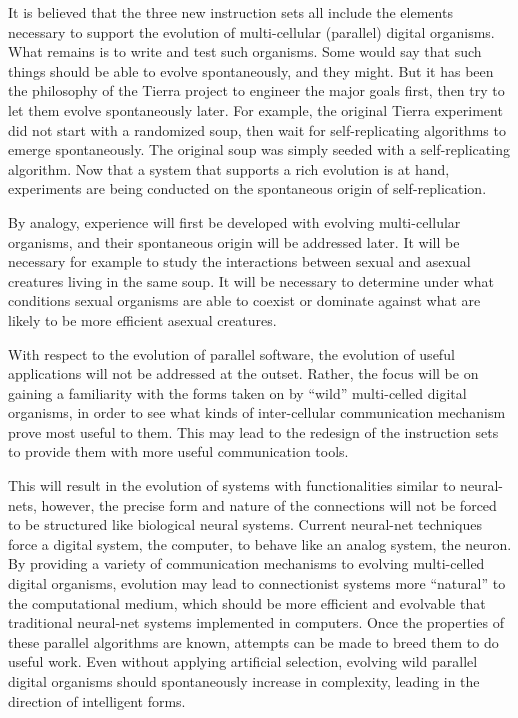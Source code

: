 It is believed that the three new instruction sets all include the elements
necessary to support the evolution of multi-cellular (parallel) digital
organisms.  What remains is to write and test such organisms.  Some would
say that such things should be able to evolve spontaneously, and they might.
But it has been the philosophy of the Tierra project to engineer the major
goals first, then try to let them evolve spontaneously later.  For example,
the original Tierra experiment did not start with a randomized soup, then
wait for self-replicating algorithms to emerge spontaneously.  The original
soup was simply seeded with a self-replicating algorithm.  Now that a system
that supports a rich evolution is at hand, experiments are being conducted on
the spontaneous origin of self-replication.

By analogy, experience will first be developed with evolving multi-cellular
organisms, and their spontaneous origin will be addressed later.  It will be
necessary for example to study the interactions between sexual and asexual
creatures living in the same soup.  It will be necessary to determine
under what conditions sexual organisms are able to coexist or dominate
against what are likely to be more efficient asexual creatures.

With respect to the evolution of parallel software, the evolution of useful
applications will not be addressed at the outset.  Rather, the focus will be
on gaining a familiarity with the forms taken on by ``wild'' multi-celled
digital organisms, in order to see what kinds of inter-cellular communication
mechanism prove most useful to them.  This may lead to the redesign of the
instruction sets to provide them with more useful communication tools.  

This will result in the evolution of systems with functionalities similar
to neural-nets, however, the precise form and nature of the connections will
not be forced to be structured like biological neural systems.  Current
neural-net techniques force a digital system, the computer, to behave like
an analog system, the neuron.  By providing a variety of communication
mechanisms to evolving multi-celled digital organisms, evolution may lead
to connectionist systems more ``natural'' to the computational medium,
which should be more efficient and evolvable that traditional neural-net
systems implemented in computers.  Once the properties of these parallel
algorithms are known, attempts can be made to breed them to do useful work.
Even without applying artificial selection, evolving wild parallel digital
organisms should spontaneously increase in complexity, leading in the
direction of intelligent forms.

